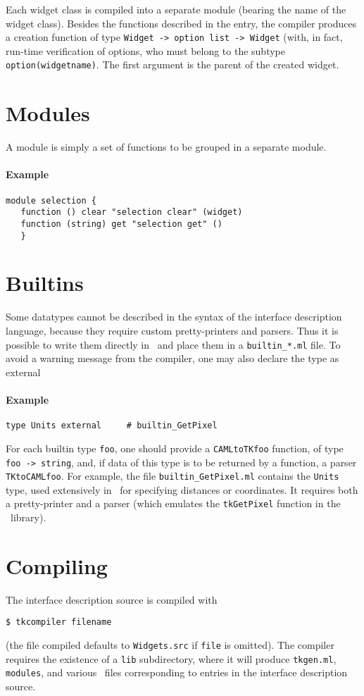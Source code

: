 Each widget class is compiled into a separate module (bearing the name of the
widget class). Besides the functions described in the entry, the compiler
produces a creation function of type \verb|Widget -> option list -> Widget|
(with, in fact, run-time verification of options, who must belong to the
subtype \verb|option(widgetname)|. The first argument is the parent of the
created widget.


\section{Modules}
A module is simply a set of functions to be grouped in a separate module.
\paragraph{Example}
\begin{verbatim}
module selection {
   function () clear "selection clear" (widget)
   function (string) get "selection get" ()
   }
\end{verbatim} 

\section{Builtins}
Some datatypes cannot be described in the syntax of the interface
description language, because they require custom pretty-printers and
parsers. Thus it is possible to write them directly in \caml\ and place
them in a \verb|builtin_*.ml| file.
To avoid a warning message from the compiler, one may also declare the type
as external
\paragraph{Example}
\begin{verbatim}
type Units external     # builtin_GetPixel
\end{verbatim} 
For each builtin type \verb|foo|, one should provide a \verb|CAMLtoTKfoo|
function, of type \verb|foo -> string|, and, if data of this type is to be
returned by a function, a parser \verb|TKtoCAMLfoo|.
For example, the file \verb|builtin_GetPixel.ml| contains the \verb|Units|
type, used extensively in \tk\ for specifying distances or coordinates.
It requires both a pretty-printer and a parser (which emulates the
\verb|tkGetPixel| function in the \tk\ library).


\section{Compiling}
The interface description source is compiled with
\begin{verbatim}
$ tkcompiler filename
\end{verbatim}
(the file compiled defaults to \verb|Widgets.src| if \verb|file| is
omitted).
The compiler requires the existence of a \verb|lib| subdirectory, where it
will produce \verb|tkgen.ml|, \verb|modules|, and various \caml\ files
corresponding to entries in the interface description source.


